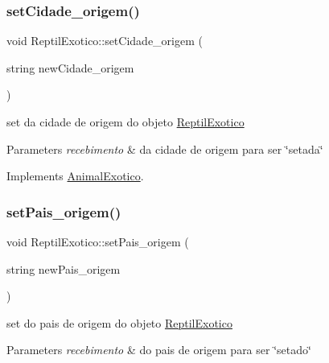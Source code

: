 \mbox{\label{class_reptil_exotico_a06ab0bc9e68279fe681b781c14b4917d}} 
\subsubsection{\texorpdfstring{setCidade\_origem()}{setCidade\_origem()}}
{\footnotesize\ttfamily void Reptil\+Exotico\+::set\+Cidade\+\_\+origem (\begin{DoxyParamCaption}\item[{string}]{new\+Cidade\+\_\+origem }\end{DoxyParamCaption})\hspace{0.3cm}{\ttfamily [virtual]}}



set da cidade de origem do objeto \mbox{\hyperlink{class_reptil_exotico}{Reptil\+Exotico}} 


\begin{DoxyParams}{Parameters}
{\em recebimento} & da cidade de origem para ser \char`\"{}setada\char`\"{} \\
\hline
\end{DoxyParams}


Implements \mbox{\hyperlink{class_animal_exotico}{Animal\+Exotico}}.

\mbox{\label{class_reptil_exotico_af564906886dfd2a83e253155a84b8cae}} 
\subsubsection{\texorpdfstring{setPais\_origem()}{setPais\_origem()}}
{\footnotesize\ttfamily void Reptil\+Exotico\+::set\+Pais\+\_\+origem (\begin{DoxyParamCaption}\item[{string}]{new\+Pais\+\_\+origem }\end{DoxyParamCaption})\hspace{0.3cm}{\ttfamily [virtual]}}



set do pais de origem do objeto \mbox{\hyperlink{class_reptil_exotico}{Reptil\+Exotico}} 


\begin{DoxyParams}{Parameters}
{\em recebimento} & do pais de origem para ser \char`\"{}setado\char`\"{} \\
\hline
\end{DoxyParams}


